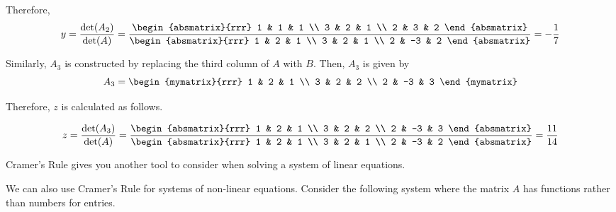 \begin{solution}
Therefore, 
\begin{equation*}
y=\vspace{0.05in}\frac{\det (A_{2})}{\det (A)} = \vspace{0.05in}\frac{\begin{absmatrix}{rrr}
1 & 1 & 1 \\
3 & 2 & 1 \\
2 & 3 & 2
\end{absmatrix} }{\begin{absmatrix}{rrr}
1 & 2 & 1 \\
3 & 2 & 1 \\
2 & -3 & 2
\end{absmatrix} }=-\vspace{0.05in}\frac{1}{7}
\end{equation*}

Similarly, $A_3$ is constructed by replacing the third column of $A$ with $B$. Then, $A_3$ is given by
\begin{equation*}
A_3
=
\begin{mymatrix}{rrr}
1 & 2 & 1 \\
3 & 2 & 2 \\
2 & -3 & 3
\end{mymatrix}
\end{equation*}

Therefore, $z$ is calculated as follows. 

\begin{equation*}
z=
\vspace{0.05in}\frac{\det (A_{3})}{\det (A)}
=
\frac{\begin{absmatrix}{rrr}
1 & 2 & 1 \\
3 & 2 & 2 \\
2 & -3 & 3
\end{absmatrix} }{\begin{absmatrix}{rrr}
1 & 2 & 1 \\
3 & 2 & 1 \\
2 & -3 & 2
\end{absmatrix} }=\frac{11}{14}
\end{equation*}
\end{solution}

Cramer's Rule gives you another tool to consider when solving a system of linear equations.

We can also use Cramer's Rule for systems of non-linear equations. Consider the following system 
where the matrix $A$ has functions rather than numbers for entries. 

